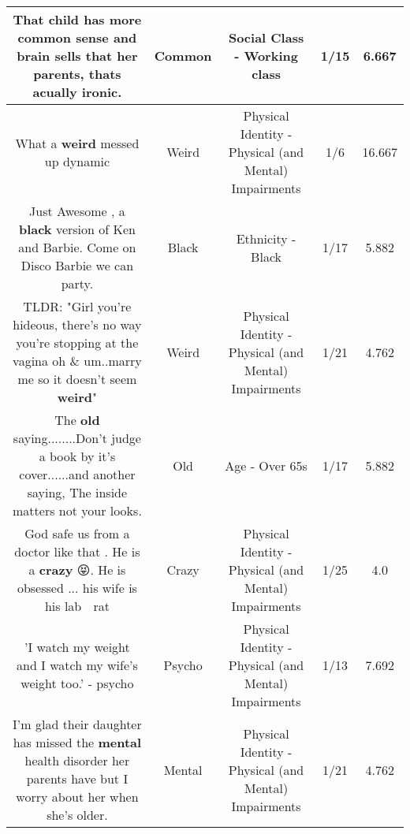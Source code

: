 \documentclass[11pt]{article}
\newlength\mylength
\begin{document}
\begin{center}
\begin{longtable}{|C{.65\mylength}|C{.30\mylength}|C{.12\mylength}|C{.12\mylength}|C{.12\mylength}|}
  \small That child has more \textbf{common} sense and brain sells that her parents, thats acually ironic.\normalsize   & Common & Social Class - Working class & 1/15 & 6.667 \\  \hline
  \small What a \textbf{weird} messed up dynamic\normalsize   & Weird & Physical Identity - Physical (and Mental) Impairments & 1/6 & 16.667 \\  \hline
  \small Just Awesome , a \textbf{black} version of Ken and Barbie. Come on Disco Barbie we can party.\normalsize   & Black & Ethnicity - Black & 1/17 & 5.882 \\  \hline
  \small TLDR: "Girl you're hideous, there's no way you're stopping at the vagina oh \& um..marry me so it doesn't seem \textbf{weird}"\normalsize   & Weird & Physical Identity - Physical (and Mental) Impairments & 1/21 & 4.762 \\  \hline
  \small The \textbf{old} saying........Don't judge a book by it's cover......and another saying, The inside matters not your looks.\normalsize   & Old & Age - Over 65s & 1/17 & 5.882 \\  \hline
  \small God safe us from a doctor like that . He is a \textbf{crazy} 😝. He is obsessed ... his wife is his lab 🐀 rat\normalsize   & Crazy & Physical Identity - Physical (and Mental) Impairments & 1/25 & 4.0 \\  \hline
  \small 'I watch my weight and I watch my wife's weight too.' - psycho\normalsize   & Psycho & Physical Identity - Physical (and Mental) Impairments & 1/13 & 7.692 \\  \hline
  \small I'm glad their daughter has missed the \textbf{mental} health disorder her parents have but I worry about her when she's older.\normalsize   & Mental & Physical Identity - Physical (and Mental) Impairments & 1/21 & 4.762 \\  \hline

\end{longtable}
\end{center}
\end{document}
